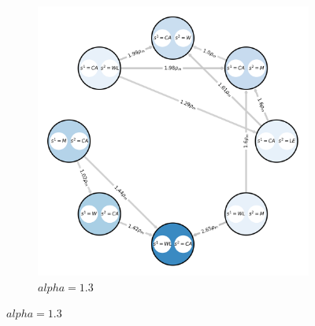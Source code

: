 \begin{figure}[H]
\begin{subfigure}[b]{0.45\linewidth}
                \includegraphics[width=\linewidth]{images/rg_1.3.png}
                \caption{$alpha=1.3$}
                \label{fig:response_graph_1.3}
            \end{subfigure}


\end{figure}
